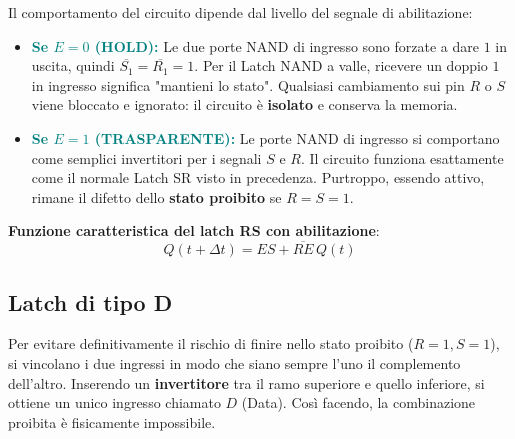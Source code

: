 \documentclass[11pt,a4paper]{report}
\begin{document}
Il comportamento del circuito dipende dal livello del segnale di abilitazione:
\begin{itemize}[leftmargin=1.5em,itemsep=4pt]
  \item \textcolor{teal}{\textbf{Se $E=0$ (HOLD):}} Le due porte NAND di ingresso sono forzate a dare $1$ in uscita, quindi $\overline{S_1}=\overline{R_1}=1$. Per il Latch NAND a valle, ricevere un doppio $1$ in ingresso significa "mantieni lo stato". Qualsiasi cambiamento sui pin $R$ o $S$ viene bloccato e ignorato: il circuito è \textbf{isolato} e conserva la memoria.
  \item \textcolor{teal}{\textbf{Se $E=1$ (TRASPARENTE):}} Le porte NAND di ingresso si comportano come semplici invertitori per i segnali $S$ e $R$. Il circuito funziona esattamente come il normale Latch SR visto in precedenza. Purtroppo, essendo attivo, rimane il difetto dello \textbf{stato proibito} se $R=S=1$.
\end{itemize}

\noindent\textbf{Funzione caratteristica del latch RS con abilitazione}:
\[
\boxed{Q(t+\Delta t) = ES + \overline{RE}\,Q(t)}
\]

\subsection{Latch di tipo D}

Per evitare definitivamente il rischio di finire nello stato proibito ($R=1, S=1$), si vincolano i due ingressi in modo che siano sempre l'uno il complemento dell'altro. Inserendo un \textbf{invertitore} tra il ramo superiore e quello inferiore, si ottiene un unico ingresso chiamato $D$ (Data). Così facendo, la combinazione proibita è fisicamente impossibile.
\end{document}
